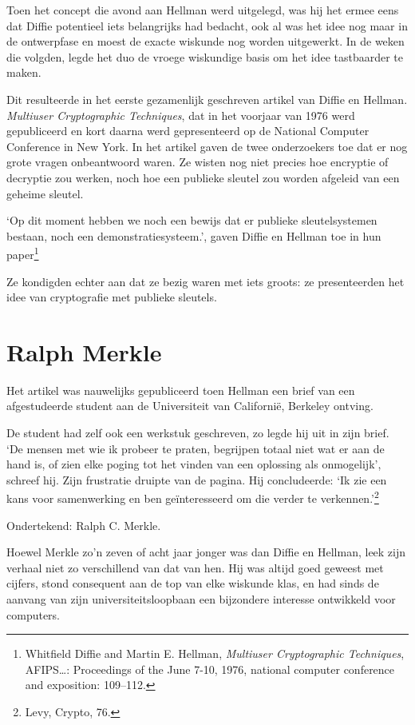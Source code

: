 \documentclass[
  a5paper,
  smalldemyvopaper,11pt,twoside,onecolumn,openright,extrafontsizes,
hidelinks]{memoir}
\begin{document}
Toen het concept die avond aan Hellman werd uitgelegd, was hij het ermee
eens dat Diffie potentieel iets belangrijks had bedacht, ook al was het
idee nog maar in de ontwerpfase en moest de exacte wiskunde nog worden
uitgewerkt. In de weken die volgden, legde het duo de vroege wiskundige
basis om het idee tastbaarder te maken.

Dit resulteerde in het eerste gezamenlijk geschreven artikel van Diffie
en Hellman. \emph{Multiuser Cryptographic Techniques}, dat in het
voorjaar van 1976 werd gepubliceerd en kort daarna werd gepresenteerd op
de National Computer Conference in New York. In het artikel gaven de
twee onderzoekers toe dat er nog grote vragen onbeantwoord waren. Ze
wisten nog niet precies hoe encryptie of decryptie zou werken, noch hoe
een publieke sleutel zou worden afgeleid van een geheime sleutel.

`Op dit moment hebben we noch een bewijs dat er publieke sleutelsystemen
bestaan, noch een demonstratiesysteem.', gaven Diffie en Hellman toe in
hun paper\footnote{Whitfield Diffie and Martin E. Hellman,
  \emph{Multiuser Cryptographic Techniques}, AFIPS\ldots: Proceedings of
  the June 7-10, 1976, national computer conference and exposition:
  109--112.}

Ze kondigden echter aan dat ze bezig waren met iets groots: ze
presenteerden het idee van cryptografie met publieke sleutels.

\section{Ralph Merkle}\label{ralph-merkle}

Het artikel was nauwelijks gepubliceerd toen Hellman een brief van een
afgestudeerde student aan de Universiteit van Californië, Berkeley
ontving.

De student had zelf ook een werkstuk geschreven, zo legde hij uit in
zijn brief. `De mensen met wie ik probeer te praten, begrijpen totaal
niet wat er aan de hand is, of zien elke poging tot het vinden van een
oplossing als onmogelijk', schreef hij. Zijn frustratie druipte van de
pagina. Hij concludeerde: `Ik zie een kans voor samenwerking en ben
geïnteresseerd om die verder te verkennen.'\footnote{\hspace{0pt}Levy,
  Crypto, 76.}

Ondertekend: Ralph C. Merkle.

Hoewel Merkle zo'n zeven of acht jaar jonger was dan Diffie en Hellman,
leek zijn verhaal niet zo verschillend van dat van hen. Hij was altijd
goed geweest met cijfers, stond consequent aan de top van elke wiskunde
klas, en had sinds de aanvang van zijn universiteitsloopbaan een
bijzondere interesse ontwikkeld voor computers.
\end{document}
